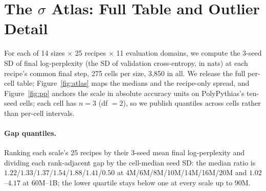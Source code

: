 
\section{The $\sigma$ Atlas: Full Table and Outlier Detail}
\label{app:atlas}

For each of 14 sizes $\times$ 25 recipes $\times$ 11 evaluation domains, we compute the 3-seed
SD of final log-perplexity (the SD of validation cross-entropy, in nats) at each recipe's common
final step, 275 cells per size, 3{,}850 in all. We release the full per-cell table; Figure~\ref{fig:atlas} maps the medians and the recipe-only spread, and Figure~\ref{fig:pp} anchors the scale in absolute accuracy units on PolyPythias's ten-seed cells;
each cell has $n = 3$ (df $= 2$), so we publish quantiles across cells rather than per-cell
intervals.

\paragraph{Gap quantiles.} Ranking each scale's 25 recipes by their 3-seed mean final
log-perplexity and dividing each rank-adjacent gap by the cell-median seed SD: the median
ratio is $1.22$/$1.33$/$1.37$/$1.54$/$1.88$/$1.41$/$0.50$ at 4M/6M/8M/10M/14M/16M/20M and
$1.02$--$4.17$ at 60M--1B; the lower quartile stays below one at every scale up to 90M.

